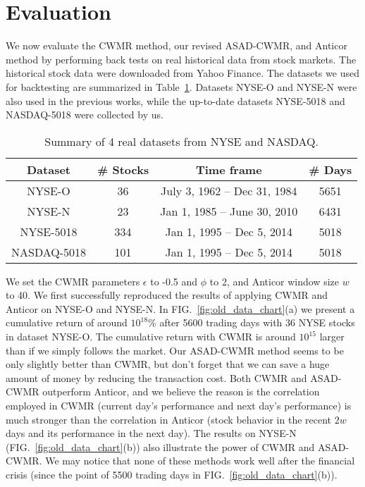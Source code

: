 \section{Evaluation}

We now evaluate the CWMR method, our revised ASAD-CWMR, and Anticor method by performing back tests on real historical data from stock markets. The historical stock data were downloaded from Yahoo Finance. The datasets we used for backtesting are summarized in Table~\ref{tab:dataset}. Datasets NYSE-O and NYSE-N were also used in the previous works\cite{OnlinePortfolio, AntiCor}, while the up-to-date datasets NYSE-5018 and NASDAQ-5018 were collected by us.

\begin{table}
\caption{Summary of 4 real datasets from NYSE and NASDAQ.}
\label{tab:dataset}
\begin{center}
\begin{tabular}{cccc}
\hline
Dataset &  \# Stocks & Time frame &  \# Days \\
\hline
NYSE-O & 36 & July 3, 1962 -- Dec 31, 1984 & 5651 \\
NYSE-N & 23 & Jan 1, 1985 -- June 30, 2010 & 6431 \\
NYSE-5018 & 334 & Jan 1, 1995 -- Dec 5, 2014 & 5018 \\
NASDAQ-5018 & 101 & Jan 1, 1995 -- Dec 5, 2014 & 5018 \\
\hline
\end{tabular}
\end{center}
\end{table}

We set the CWMR parameters $\epsilon$ to -0.5 and $\phi$ to 2, and Anticor window size $w$ to 40. We first successfully reproduced the results of applying CWMR and Anticor on NYSE-O and NYSE-N. In FIG.~\ref{fig:old_data_chart}(a) we present a cumulative return of around $10^{18}$\% after 5600 trading days with 36 NYSE stocks in dataset NYSE-O. The cumulative return with CWMR is around  $10^{15}$ larger than if we simply follows the market. Our ASAD-CWMR method seems to be only slightly better than CWMR, but don't forget that we can save a huge amount of money by reducing the transaction cost. Both CWMR and ASAD-CWMR outperform Anticor, and we believe the reason is the correlation employed in CWMR (current day's performance and next day's performance) is much stronger than the correlation in Anticor (stock behavior in the recent $2w$ days and its performance in the next day). The results on NYSE-N (FIG.~\ref{fig:old_data_chart}(b)) also illustrate the power of CWMR and ASAD-CWMR. We may notice that none of these methods work well after the financial crisis (since the point of 5500 trading days in FIG.~\ref{fig:old_data_chart}(b)).

